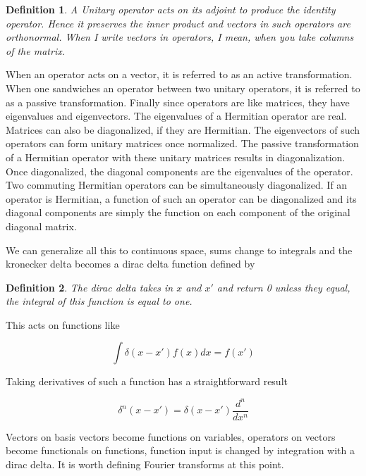 \documentclass{tufte-book}
\newtheorem{definition}{Definition}
\begin{document}
\begin{definition}
  \label{def:11}
  A Unitary operator acts on its adjoint to produce the identity operator. Hence it preserves the inner product and vectors in such operators are orthonormal. When I write vectors in operators, I mean, when you take columns of the matrix.
\end{definition}

When an operator acts on a vector, it is referred to as an active transformation. When one sandwiches an operator between two unitary operators, it is referred to as a passive transformation. Finally since operators are like matrices, they have eigenvalues and eigenvectors. The eigenvalues of a Hermitian operator are real. Matrices can also be diagonalized, if they are Hermitian. The eigenvectors of such operators can form unitary matrices once normalized. The passive transformation of a Hermitian operator with these unitary matrices results in diagonalization. Once diagonalized, the diagonal components are the eigenvalues of the operator. Two commuting Hermitian operators can be simultaneously diagonalized. If an operator is Hermitian, a function of such an operator can be diagonalized and its diagonal components are simply the function on each component of the original diagonal matrix.

We can generalize all this to continuous space, sums change to integrals and the kronecker delta becomes a dirac delta function defined by

\begin{definition}
  \label{def:12}
  The dirac delta takes in $x$ and $x'$ and return 0 unless they equal, the integral of this function is equal to one.
\end{definition}

This acts on functions like

\begin{equation}
	\label{eq:dd}
	\int\delta(x-x')f(x)dx = f(x')
\end{equation}

Taking derivatives of such a function has a straightforward result

\begin{equation}
	\label{eq:9}
	\delta^n(x-x') = \delta(x-x')\frac{d^n}{dx^n}
\end{equation}

Vectors on basis vectors become functions on variables, operators on vectors become functionals on functions, function input is changed by integration with a dirac delta. It is worth defining Fourier transforms at this point.
\end{document}
